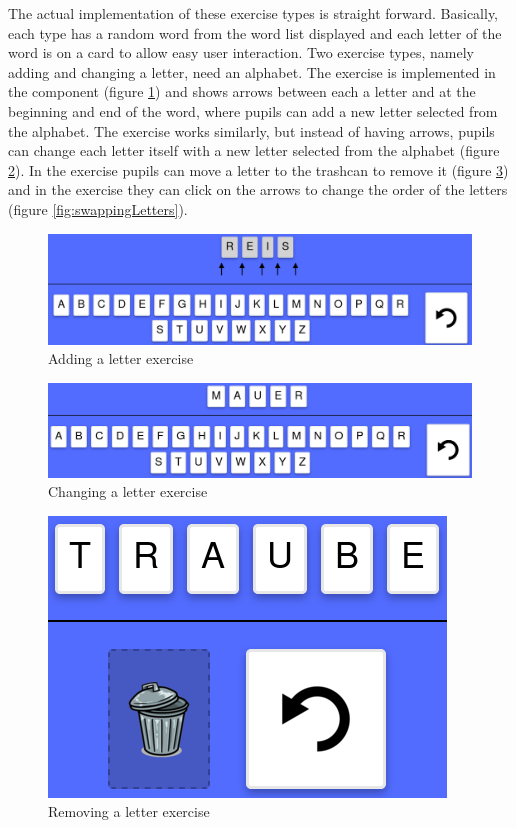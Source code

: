 The actual implementation of these exercise types is straight forward. Basically, each type has a random word from the word list displayed and each letter of the word is on a card to allow easy user interaction. Two exercise types, namely adding and changing a letter, need an alphabet. The  exercise is implemented in the  component (figure \ref{fig:addingLetter}) and shows arrows between each a letter and at the beginning and end of the word, where pupils can add a new letter selected from the alphabet. The  exercise works similarly, but instead of having arrows, pupils can change each letter itself with a new letter selected from the alphabet (figure \ref{fig:changingLetter}). In the  exercise pupils can move a letter to the trashcan to remove it (figure \ref{fig:removingLetter}) and in the  exercise they can click on the arrows to change the order of the letters (figure \ref{fig:swappingLetters}).

\begin{figure} 
  \centering
  \includegraphics[width=1.0 \columnwidth]{figures/words_add.png}
  \caption{Adding a letter exercise} 
  \label{fig:addingLetter} 
\end{figure}

\begin{figure} 
  \centering
  \includegraphics[width=1.0 \columnwidth]{figures/words_change.png}
  \caption{Changing a letter exercise} 
  \label{fig:changingLetter} 
\end{figure}

\begin{figure} 
  \centering
  \includegraphics[width=0.3 \columnwidth]{figures/words_remove.png}
  \caption{Removing a letter exercise} 
  \label{fig:removingLetter} 
\end{figure}

